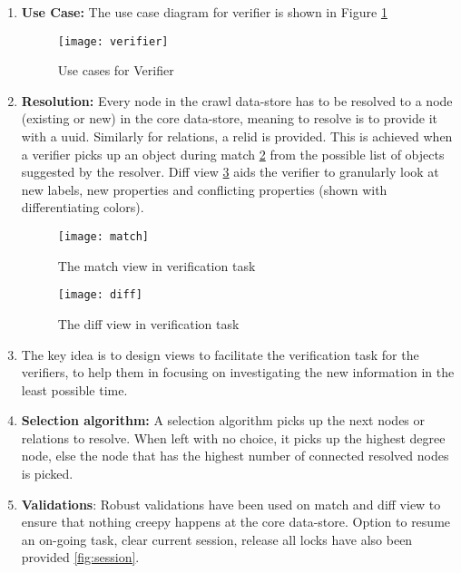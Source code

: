 \begin{enumerate}

\item \textbf{Use Case:} The use case diagram for verifier is shown in Figure \ref{fig:verifier}


\begin{figure}[H]
\begin{center}  
\texttt{[image: verifier]} 
\caption{Use cases for Verifier}
\label{fig:verifier}
\end{center}
\end{figure}
 
\item \textbf{Resolution:} Every node in the crawl data-store has to be resolved to a node (existing or new) in the core data-store, meaning to resolve is to provide it with a uuid. Similarly for relations, a relid is provided. This is achieved when a verifier picks up an object during match \ref{fig:match} from the possible list of objects suggested by the resolver. Diff view \ref{fig:diff} aids the verifier to granularly look at new labels, new properties and conflicting properties (shown with differentiating colors).

\begin{figure}[H]
\begin{center}  
\texttt{[image: match]} 
\caption{The match view in verification task}
\label{fig:match}
\end{center}
\end{figure}

\begin{figure}[H]
\begin{center}  
\texttt{[image: diff]} 
\caption{The diff view in verification task}
\label{fig:diff}
\end{center}
\end{figure}

\item The key idea is to design views to facilitate the verification task for the verifiers, to help them in focusing on investigating the new information in the least possible time. 

\item \textbf{Selection algorithm:} A selection algorithm picks up the next nodes or relations to resolve. When left with no choice, it picks up the highest degree node, else the node that has the highest number of connected resolved nodes is picked.

\item \textbf{Validations}: Robust validations have been used on match and diff view to ensure that nothing creepy happens at the core data-store. Option to resume an on-going task, clear current session, release all locks have also been provided \ref{fig:session}.


\end{enumerate}
